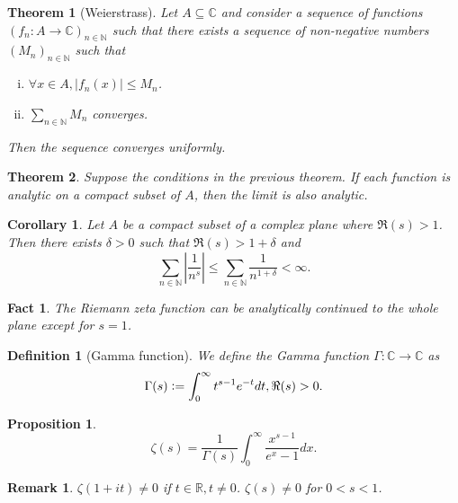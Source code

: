 \documentclass{article}
\newtheorem{theorem}{Theorem} [section]
\newtheorem{proposition}{Proposition}[section]
\newtheorem{definition}{Definition}[section]
\newtheorem{remark}{Remark}[section]
\newtheorem{corollary}{Corollary} [section]
\newtheorem{fact}{Fact}[section]
\newcommand{\defeq}{\vcentcolon=}
\newcommand{\N}[0]{\mathbb{N}}
\newcommand{\R}[0]{\mathbb{R}}
\newcommand{\C}[0]{\mathbb{C}}
\begin{document}
\begin{theorem}[Weierstrass]
Let $A\subseteq\C$ and consider a sequence of functions $(f_n:A\to\C)_{n\in \N}$ such that there exists a sequence of non-negative numbers $(M_n)_{n\in \N}$ such that 
\begin{enumerate}[i).]
\item $\forall x\in A, \vert f_n(x)\vert\leq M_n$.
\item $\sum_{n\in \N}M_n$ converges.
\end{enumerate}
Then the sequence converges uniformly.
\end{theorem}

\begin{theorem}
Suppose the conditions in the previous theorem. If each function is analytic on a compact subset of $A$, then the limit is also analytic.
\end{theorem}

\begin{corollary}
Let $A$ be a compact subset of a complex plane where $\Re(s)>1$. Then there exists $\delta>0$ such that $\Re(s)>1+\delta$ and 
\begin{equation*}
\sum_{n\in\N}\left\vert{\frac 1 {n^s}}\right\vert \leq \sum_{n\in\N} {\frac 1 {n^{1+\delta}}} < \infty.
\end{equation*}
\end{corollary}

\begin{fact}
The Riemann zeta function can be analytically continued to the whole plane except for $s=1$. 
\end{fact}

\begin{definition}[Gamma function] We define the Gamma function $\Gamma:\C\to\C$ as
  \begin{equation*}
    \Gamma(s)\defeq \int_0^\infty t^{s-1}e^{-t}dt, \Re(s)>0.
  \end{equation*}
\end{definition}

\begin{proposition}
\begin{equation*}
\zeta(s) = {\frac 1 {\Gamma(s)}}\int_0^\infty {\frac {x^{s-1}} {e^x-1}}dx.
\end{equation*}
\end{proposition}

\begin{remark}
$\zeta(1+it) \not=0$ if $t\in\R,t\not=0$. $\zeta(s) \not=0$ for $0<s<1$.
\end{remark}
\end{document}
